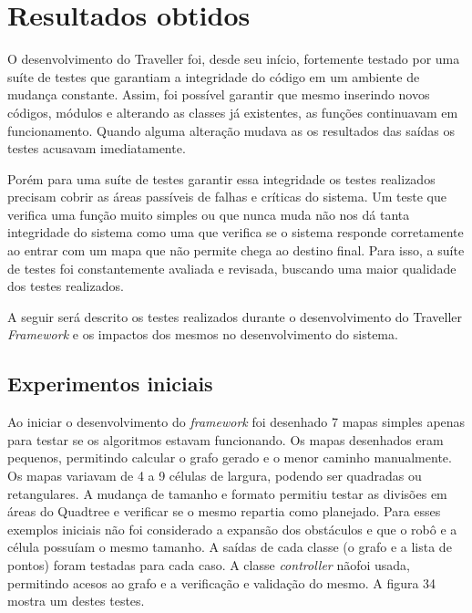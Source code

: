 \chapter[Resultados obtidos]{Resultados obtidos}

O desenvolvimento do Traveller foi, desde seu início, fortemente testado por uma suíte de testes que garantiam a integridade do código em um ambiente de mudança constante. Assim, foi possível garantir que mesmo inserindo novos códigos, módulos e alterando as classes já existentes, as funções continuavam em funcionamento. Quando alguma alteração mudava as os resultados das saídas os testes acusavam imediatamente.

Porém para uma suíte de testes garantir essa integridade os testes realizados precisam cobrir as áreas passíveis de falhas e críticas do sistema. Um teste que verifica uma função muito simples ou que nunca muda não nos dá tanta integridade do sistema como uma que verifica se o sistema responde corretamente ao entrar com um mapa que não permite chega ao destino final. Para isso, a suíte de testes foi constantemente avaliada e revisada, buscando uma maior qualidade dos testes realizados.

A seguir será descrito os testes realizados durante o desenvolvimento do Traveller \textit{Framework} e os impactos dos mesmos no desenvolvimento do sistema.

\section{Experimentos iniciais}

Ao iniciar o desenvolvimento do \textit{framework} foi desenhado 7 mapas simples apenas para testar se os algoritmos estavam funcionando. Os mapas desenhados eram pequenos, permitindo calcular o grafo gerado e o menor caminho manualmente. Os mapas variavam  de 4 a 9 células de largura, podendo ser quadradas ou retangulares. A mudança de tamanho e formato permitiu testar as divisões em áreas do Quadtree e verificar se o mesmo repartia como planejado. Para esses exemplos iniciais não foi considerado a expansão dos obstáculos e que o robô e a célula possuíam o mesmo tamanho. A saídas de cada classe (o grafo e a lista de pontos) foram testadas para cada caso. A classe \textit{controller} nãofoi usada, permitindo acesos ao grafo e a verificação e validação do mesmo. A figura 34 mostra um destes testes.

